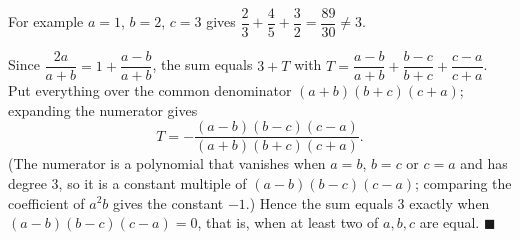 For example $a=1$, $b=2$, $c=3$ gives $\dfrac23+\dfrac45+\dfrac32=\dfrac{89}{30}\ne3$.

Since $\dfrac{2a}{a+b}=1+\dfrac{a-b}{a+b}$, the sum equals $3+T$ with $T=\dfrac{a-b}{a+b}+\dfrac{b-c}{b+c}+\dfrac{c-a}{c+a}$. Put everything over the common denominator $(a+b)(b+c)(c+a)$; expanding the numerator gives
\[T=-\dfrac{(a-b)(b-c)(c-a)}{(a+b)(b+c)(c+a)}.\]
(The numerator is a polynomial that vanishes when $a=b$, $b=c$ or $c=a$ and has degree $3$, so it is a constant multiple of $(a-b)(b-c)(c-a)$; comparing the coefficient of $a^2b$ gives the constant $-1$.) Hence the sum equals $3$ exactly when $(a-b)(b-c)(c-a)=0$, that is, when at least two of $a,b,c$ are equal. $\blacksquare$
